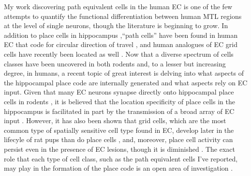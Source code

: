 My work discovering path equivalent cells in the human EC is one of the few attempts to quantify the functional differentiation between human MTL regions at the level of single neurons, though the literature is beginning to grow. In addition to place cells in hippocampus \citep{EkstEtal03},``path cells'' have been found in human EC that code for circular direction of travel \citep{JacoEtal10}, and human analogues of EC grid cells have recently been located as well \citep{JacoEtal13}. Now that a diverse spectrum of cells classes have been uncovered in both rodents and, to a lesser but increasing degree, in humans, a recent topic of great interest is delving into what aspects of the hippocampal place code are internally generated and what aspects rely on EC input. Given that many EC neurons synapse directly onto hippocampal place cells in rodents \citep{ZhanEtal13}, it is believed that the location specificity of place cells in the hippocampus is facilitated in part by the transmission of a broad array of EC input \citep{MoseMose13}. However, it has also been shown that grid cells, which are the most common type of spatially sensitive cell type found in EC, develop later in the lifecyle of rat pups than do place cells \citep{LangEtal10,WillEtal10}, and, moreover, place cell activity can persist even in the presence of EC lesions, though it is diminished \citep{HaleEtal14}. The exact role that each type of cell class, such as the path equivalent cells I've reported, may play in the formation of the place code is an open area of investigation \citep{BushEtal14}.





